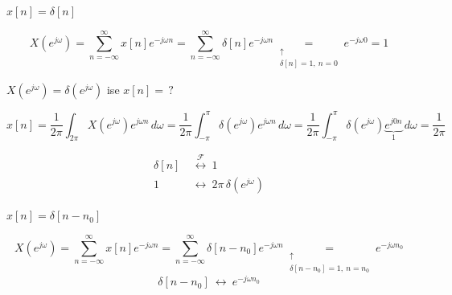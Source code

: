 \documentclass[11pt,a4paper]{article}
\begin{document}
\providecommand{\ciz}[1]{\tikz[baseline=(c.base)]{\node[inner sep=0pt] (c) {$#1$}; \draw[turuncukalem, thick] (c.south west) -- (c.north east);}}
\begin{ornek}[]
  $x[n]=\delta[n]$
\end{ornek}
\[
  X(e^{j\omega})=\sum_{n=-\infty}^{\infty}x[n]e^{-j\omega n}=\sum_{n=-\infty}^{\infty}\delta[n]e^{-j\omega n}
  \underset{\substack{\uparrow\\ \delta[n]=1,\ n=0}}{=}e^{-j\omega0}=1
\]

\begin{ornek}[]
  $X(e^{j\omega})=\delta(e^{j\omega})$ ise $x[n]=\,?$
\end{ornek}
\[
  x[n]=\frac{1}{2\pi}\int_{2\pi}X(e^{j\omega})e^{j\omega n}\,d\omega
  =\frac{1}{2\pi}\int_{-\pi}^{\pi}\delta(e^{j\omega})e^{j\omega n}\,d\omega
  =\frac{1}{2\pi}\int_{-\pi}^{\pi}\delta(e^{j\omega})\underbrace{e^{j0n}}_{1}\,d\omega=\frac{1}{2\pi}
\]
\begin{center}
\end{center}
\begin{align*}
  \delta[n]&\ \overset{\mathcal{F}}{\longleftrightarrow}\ 1\\
  1&\ \longleftrightarrow\ 2\pi\,\delta(e^{j\omega})
\end{align*}

\begin{ornek}[]
  $x[n]=\delta[n-n_0]$
\end{ornek}
\[
  X(e^{j\omega})=\sum_{n=-\infty}^{\infty}x[n]e^{-j\omega n}=\sum_{n=-\infty}^{\infty}\delta[n-n_0]e^{-j\omega n}
  \underset{\substack{\uparrow\\ \delta[n-n_0]=1,\ n=n_0}}{=}e^{-j\omega n_0}
\]
\[ \delta[n-n_0]\ \longleftrightarrow\ e^{-j\omega n_0} \]
\end{document}
